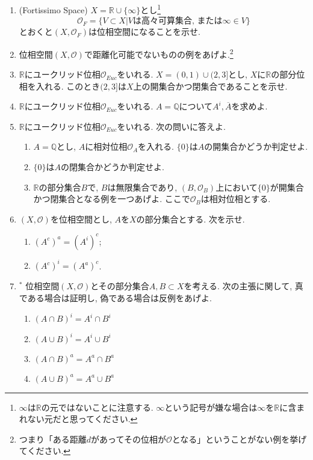 \documentclass[dvipdfmx,a4paper,11pt]{article}
\newcommand{\R}{\mathbb{R}}
\newcommand{\Q}{\mathbb{Q}}
\theoremstyle{definition}
\begin{document}
\begin{enumerate}[ label=\textbf{問}2.\arabic*]
\item (Fortissimo Space) $X = \R \cup \{ \infty \}$とし\footnote{$\infty$は$\R$の元ではないことに注意する. $\infty$という記号が嫌な場合は$\infty$を$\R$に含まれない元だと思ってください.}
$$
\mathscr{O}_{F}= \{ V \subset X | \text{$V$は高々可算集合, または$\infty \in V$}\}
$$
とおくと$(X, \mathscr{O}_{F})$は位相空間になることを示せ.

\item 位相空間$(X, \mathscr{O})$で距離化可能でないものの例をあげよ.\footnote{つまり「ある距離$d$があってその位相が$\mathscr{O}$となる」ということがない例を挙げてください.}


\item $\R$にユークリッド位相$\mathscr{O}_{Euc}$をいれる. $X = (0,1) \cup (2,3]$とし, $X$に$\R$の部分位相を入れる. このとき$(2,3]$は$X$上の開集合かつ閉集合であることを示せ. 

\item $\R$にユークリッド位相$\mathscr{O}_{Euc}$をいれる. $A=\Q$について$A^{i},\overline{A}$を求めよ.

\item $\R$にユークリッド位相$\mathscr{O}_{Euc}$をいれる. 次の問いに答えよ.
	\begin{enumerate}
	\item $A=\Q$とし, $A$に相対位相$\mathscr{O}_{A}$を入れる. $\{ 0\}$は$A$の開集合かどうか判定せよ. 
	\item $\{ 0\}$は$A$の閉集合かどうか判定せよ.
	\item $\R$の部分集合$B$で, $B$は無限集合であり, $(B, \mathscr{O}_{B})$上において$\{ 0\}$が開集合かつ閉集合となる例を一つあげよ. ここで$\mathscr{O}_{B}$は相対位相とする.
	\end{enumerate}
	
\item $(X, \mathscr{O})$を位相空間とし, $A$を$X$の部分集合とする. 次を示せ. 
	\begin{enumerate}
	\item $(A^c)^a = (A^i)^c$;
	\item $(A^c)^i = (A^a)^c$.
	\end{enumerate}




\item $^{*}$ 位相空間$(X, \mathscr{O})$とその部分集合$A,B \subset X$を考える. 次の主張に関して, 真である場合は証明し, 偽である場合は反例をあげよ.
	\begin{enumerate}
	\item $(A \cap B)^i = A^i \cap B^i$
	\item $(A \cup B)^i = A^i \cup B^i$
	\item $(A \cap B)^a= A^a\cap B^a$
	\item $(A \cup B)^a = A^a\cup B^a$
	\end{enumerate}


\end{enumerate}
\end{document}
